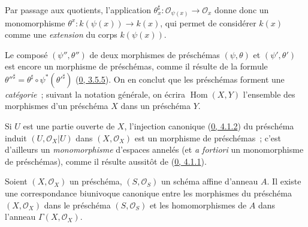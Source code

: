 
Par passage aux quotients, l'application
$\theta_x^\sharp:\mathscr{O}_{\psi(x)}\to\mathscr{O}_x$ donne donc un
monomorphisme $\theta^x:k(\psi(x))\to k(x)$, qui permet de considérer $k(x)$
comme une \emph{extension} du corps $k(\psi(x))$.

\begin{env}[2.2.2]
\label{I.2.2.2-fr}
Le composé $(\psi'',\theta'')$ de deux morphismes de préschémas
$(\psi,\theta)$ et $(\psi',\theta')$ est encore un morphisme de préschémas,
comme il résulte de la formule
${\theta''}^\sharp=\theta^\sharp\circ\psi^*({\theta'}^\sharp)$
(\hyperref[0.3.5.5-fr]{0, 3.5.5}). On en conclut que les préschémas forment
une \emph{catégorie}~; suivant la notation générale, on écrira
$\operatorname{Hom}(X,Y)$ l'ensemble des morphismes d'un préschéma $X$ dans
un préschéma $Y$.
\end{env}

\begin{example}[2.2.3]
\label{I.2.2.3-fr}
Si $U$ est une partie ouverte de $X$, l'injection canonique
(\hyperref[0.4.1.2-fr]{0, 4.1.2}) du préschéma induit
$(U,\mathscr{O}_X|U)$ dans $(X,\mathscr{O}_X)$ est un morphisme de
préschémas~; c'est d'ailleurs un \emph{monomorphisme} d'espaces annelés (et
\emph{a fortiori} un monomorphisme de préschémas), comme il résulte aussitôt
de (\hyperref[0.4.1.1-fr]{0, 4.1.1}).
\end{example}

\begin{proposition}[2.2.4]
\label{I.2.2.4-fr}
Soient $(X,\mathscr{O}_X)$ un préschéma, $(S,\mathscr{O}_S)$ un schéma affine
d'anneau $A$. Il existe une correspondance biunivoque canonique entre les
morphismes du préschéma $(X,\mathscr{O}_X)$ dans le préschéma
$(S,\mathscr{O}_S)$ et les homomorphismes de $A$ dans l'anneau
$\Gamma(X,\mathscr{O}_X)$.
\end{proposition}

